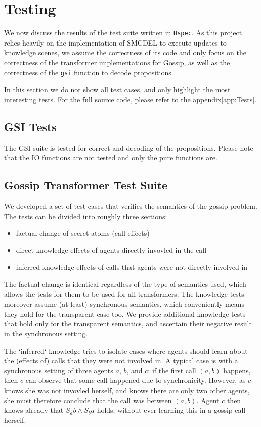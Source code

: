 \section{Testing}\label{sec:Testing}
We now discuss the results of the test suite written in \texttt{Hspec}.
As this project relies heavily on the implementation of SMCDEL to execute updates to knowledge scenes,
we assume the correctness of its code and only focus on the correctness of the transformer implementations for Gossip,
as well as the correctness of the \texttt{gsi} function to decode propositions.

In this section we do not show all test cases, and only highlight the most interesting tests. For the full source code, please
refer to the appendix\ref{app:Tests}.

\subsection{GSI Tests}
The GSI suite is tested for correct and decoding of the propositions.
Please note that the IO functions are not tested and only the pure functions are.

\subsection{Gossip Transformer Test Suite}
We developed a set of test cases that verifies the semantics of the gossip problem.
The tests can be divided into roughly three sections:
\begin{itemize}
    \item factual change of secret atoms (call effects)
    \item direct knowledge effects of agents directly invovled in the call
    \item inferred knowledge effects of calls that agents were not directly involved in
\end{itemize}

The factual change is identical regardless of the type of semantics used, which allows the tests for them to be used for all transformers.
The knowledge tests moreover assume (at least) synchronous semantics, which conveniently means they hold for the transparent case too.
We provide additional knowledge tests that hold only for the transparent semantics, and ascertain their negative result in the synchronous setting.

The `inferred` knowledge tries to isolate cases where agents should learn about the (effects of) calls that they were not involved in.
A typical case is with a synchronous setting of three agents $a$, $b$, and $c$:
if the first call $(a,b)$ happens, then $c$ can observe that some call happened due to synchronicity.
However, as $c$ knows she was not invovled herself, and knows there are only two other agents,
she must therefore conclude that the call was between $(a,b)$.
Agent $c$ then knows already that $S_ab \land S_ba$ holds, without ever learning this in a gossip call herself.

